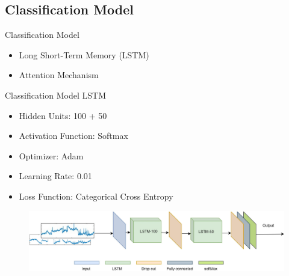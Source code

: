 \subsection*{Classification Model}
\begin{frame}{Classification Model}
    \begin{itemize}
        \item Long Short-Term Memory (LSTM)
        \item Attention Mechanism
    \end{itemize}
\end{frame}
\begin{frame}{Classification Model \textemdash{} LSTM}
    \begin{minipage}[c]{.6\textwidth}
        \begin{itemize}
            \item Hidden Units: 100 + 50
            \item Activation Function: Softmax
            \item Optimizer: Adam
            \item Learning Rate: 0.01
            \item Loss Function: Categorical Cross Entropy
        \end{itemize}
    \end{minipage}
    \begin{minipage}[c]{.39\textwidth}
        \begin{figure}[!htbp]
            \centering
            \includegraphics[width=\textwidth]{figures/Methodology/LSTM}
        \end{figure}
    \end{minipage}
\end{frame}
